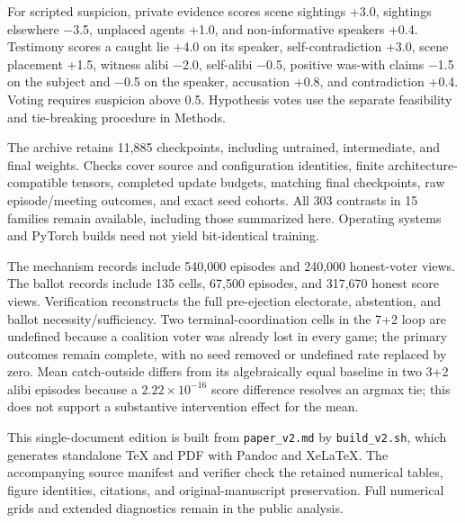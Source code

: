 \documentclass[
  12pt,
]{article}
\begin{document}
For scripted suspicion, private evidence scores scene sightings +3.0,
sightings elsewhere −3.5, unplaced agents +1.0, and non-informative
speakers +0.4. Testimony scores a caught lie +4.0 on its speaker,
self-contradiction +3.0, scene placement +1.5, witness alibi −2.0,
self-alibi −0.5, positive was-with claims −1.5 on the subject and −0.5
on the speaker, accusation +0.8, and contradiction +0.4. Voting requires
suspicion above 0.5. Hypothesis votes use the separate feasibility and
tie-breaking procedure in Methods.

The archive retains 11,885 checkpoints, including untrained,
intermediate, and final weights. Checks cover source and configuration
identities, finite architecture-compatible tensors, completed update
budgets, matching final checkpoints, raw episode/meeting outcomes, and
exact seed cohorts. All 303 contrasts in 15 families remain available,
including those summarized here. Operating systems and PyTorch builds
need not yield bit-identical training.

The mechanism records include 540,000 episodes and 240,000 honest-voter
views. The ballot records include 135 cells, 67,500 episodes, and
317,670 honest score views. Verification reconstructs the full
pre-ejection electorate, abstention, and ballot necessity/sufficiency.
Two terminal-coordination cells in the 7+2 loop are undefined because a
coalition voter was already lost in every game; the primary outcomes
remain complete, with no seed removed or undefined rate replaced by
zero. Mean catch-outside differs from its algebraically equal baseline
in two 3+2 alibi episodes because a \(2.22\times10^{-16}\) score
difference resolves an argmax tie; this does not support a substantive
intervention effect for the mean.

This single-document edition is built from \texttt{paper\_v2.md} by
\texttt{build\_v2.sh}, which generates standalone TeX and PDF with
Pandoc and XeLaTeX. The accompanying source manifest and verifier check
the retained numerical tables, figure identities, citations, and
original-manuscript preservation. Full numerical grids and extended
diagnostics remain in the public analysis.
\end{document}
